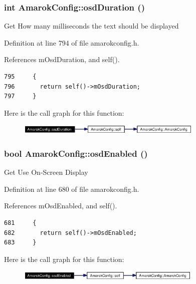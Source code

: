 \subsubsection{\setlength{\rightskip}{0pt plus 5cm}int Amarok\-Config::osd\-Duration ()\hspace{0.3cm}{\tt  [inline, static]}}\label{classAmarokConfig_AmarokConfige82}


Get How many milliseconds the text should be displayed 

Definition at line 794 of file amarokconfig.h.

References m\-Osd\-Duration, and self().



\footnotesize\begin{verbatim}795     {
796       return self()->mOsdDuration;
797     }
\end{verbatim}\normalsize 


Here is the call graph for this function:\begin{figure}[H]
\begin{center}
\leavevmode
\includegraphics[width=251pt]{classAmarokConfig_AmarokConfige82_cgraph}
\end{center}
\end{figure}
\subsubsection{\setlength{\rightskip}{0pt plus 5cm}bool Amarok\-Config::osd\-Enabled ()\hspace{0.3cm}{\tt  [inline, static]}}\label{classAmarokConfig_AmarokConfige70}


Get Use On-Screen Display 

Definition at line 680 of file amarokconfig.h.

References m\-Osd\-Enabled, and self().



\footnotesize\begin{verbatim}681     {
682       return self()->mOsdEnabled;
683     }
\end{verbatim}\normalsize 


Here is the call graph for this function:\begin{figure}[H]
\begin{center}
\leavevmode
\includegraphics[width=250pt]{classAmarokConfig_AmarokConfige70_cgraph}
\end{center}
\end{figure}
